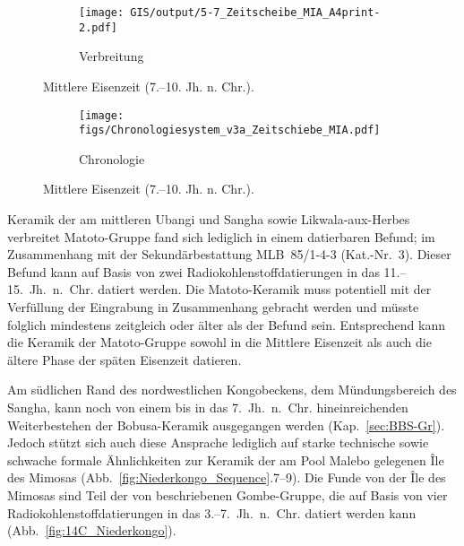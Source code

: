 \begin{figure*}[p]
	\centering
	\begin{subfigure}[b]{\textwidth}
		\centering
		\texttt{[image: GIS/output/5-7\_Zeitscheibe\_MIA\_A4print-2.pdf]}
		\vspace{2cm}
		\caption{Verbreitung}
		\label{fig:MIA_Karte}
	\end{subfigure}
	\caption{Mittlere Eisenzeit (7.--10. Jh. n. Chr.).}
	\label{}
\end{figure*}
\addtocounter{figure}{-1}
\begin{figure*}[p]
	\begin{subfigure}[b]{\textwidth}
		\setcounter{subfigure}{1}
		\centering
		\texttt{[image: figs/Chronologiesystem\_v3a\_Zeitschiebe\_MIA.pdf]}
		\caption{Chronologie}
		\label{fig:MIA_Chronologie}
	\end{subfigure}
	\caption{Mittlere Eisenzeit (7.--10. Jh. n. Chr.).}
	\label{fig:MIA}
\end{figure*}

Keramik der am mittleren Ubangi und Sangha sowie Likwala-aux-Herbes verbreitet Matoto-Gruppe fand sich lediglich in einem datierbaren Befund; im Zusammenhang mit der Sekundärbestattung MLB~85/1-4-3 (Kat.-Nr.~3). Dieser Befund kann auf Basis von zwei Radiokohlenstoffdatierungen in das 11.--15.~Jh.~n.~Chr. datiert werden. Die Matoto-Keramik muss potentiell mit der Verfüllung der Eingrabung in Zusammenhang gebracht werden und müsste folglich mindestens zeitgleich oder älter als der Befund sein. Entsprechend kann die Keramik der Matoto-Gruppe sowohl in die Mittlere Eisenzeit als auch die ältere Phase der späten Eisenzeit datieren.

Am südlichen Rand des nordwestlichen Kongobeckens, dem Mündungsbereich des Sangha, kann noch von einem bis in das 7.~Jh.~n.~Chr. hineinreichenden Weiterbestehen der Bobusa-Keramik ausgegangen werden (Kap.~\ref{sec:BBS-Gr}). Jedoch stützt sich auch diese Ansprache lediglich auf starke technische sowie schwache formale Ähnlichkeiten zur Keramik der am Pool Malebo gelegenen Île des Mimosas (Abb.~\ref{fig:Niederkongo_Sequence}.7--9). Die Funde von der Île des Mimosas sind Teil der von \textcites{deMaret.1986}{Maret.1990} beschriebenen Gombe-Gruppe, die auf Basis von vier Radiokohlenstoffdatierungen in das 3.--7.~Jh.~n.~Chr. datiert werden kann (Abb.~\ref{fig:14C_Niederkongo}).

